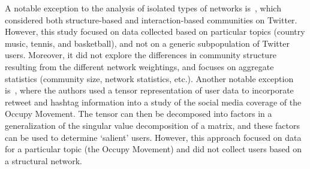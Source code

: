 A notable exception to the analysis of isolated types of networks is~\cite{lim2012tweets}, which considered both structure-based and interaction-based communities on Twitter. However, this study focused on data collected based on particular topics (country music, tennis, and basketball), and not on a generic subpopulation of Twitter users. Moreover, it did not explore the differences in community structure resulting from the different network weightings, and focuses on aggregate statistics (community size, network statistics, etc.). Another notable exception is~\cite{kao2013talison}, where the authors used a tensor representation of user data to incorporate retweet and hashtag information into a study of the social media coverage of the Occupy Movement. The tensor can then be decomposed into factors in a generalization of the singular value decomposition of a matrix, and these factors can be used to determine `salient' users. However, this approach focused on data for a particular topic (the Occupy Movement) and did not collect users based on a structural network.